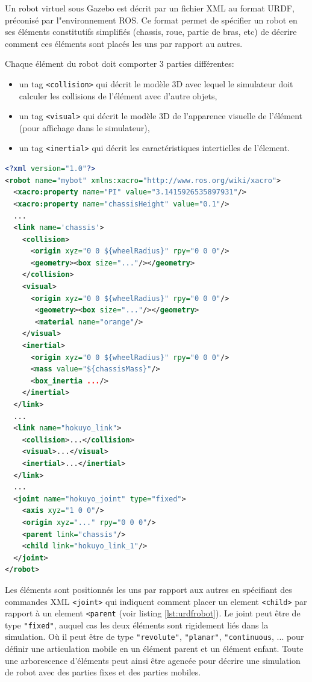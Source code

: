 \documentclass[12pt,a4paper]{report}
\begin{document}
		Un robot virtuel sous Gazebo est décrit par un fichier XML au format URDF, préconisé par l"environnement ROS. Ce format permet de spécifier un robot en ses éléments constitutifs simplifiés (chassis, roue, partie de bras, etc) de décrire comment ces éléments sont placés les uns par rapport au autres.
		
		\para Chaque élément  du robot doit comporter 3 parties différentes:
		\begin{itemize}
			\item un tag \verb|<collision>| qui décrit le modèle 3D avec lequel le simulateur doit calculer les collisions de l'élément avec d'autre objets,
			\item un tag \verb|<visual>| qui décrit le modèle 3D de l'apparence visuelle de l'élément (pour affichage dans le simulateur),
			\item un tag \verb|<inertial>| qui décrit les caractéristiques intertielles de l'élement.
		\end{itemize}
		\newpage
		
		\begin{lstlisting}[caption={Extrait d'une description URDF d'un robot},label={lst:urdfrobot},language=XML,captionpos=b,basicstyle=\footnotesize]
<?xml version="1.0"?>
<robot name="mybot" xmlns:xacro="http://www.ros.org/wiki/xacro">
  <xacro:property name="PI" value="3.1415926535897931"/>
  <xacro:property name="chassisHeight" value="0.1"/>
  ...			
  <link name='chassis'>
    <collision> 
      <origin xyz="0 0 ${wheelRadius}" rpy="0 0 0"/> 
      <geometry><box size="..."/></geometry> 
    </collision>
    <visual> 
      <origin xyz="0 0 ${wheelRadius}" rpy="0 0 0"/> 
       <geometry><box size="..."/></geometry> 
       <material name="orange"/>
    </visual>
    <inertial> 
      <origin xyz="0 0 ${wheelRadius}" rpy="0 0 0"/> 
      <mass value="${chassisMass}"/> 
      <box_inertia .../>
    </inertial>
  </link>
  ...
  <link name="hokuyo_link">
    <collision>...</collision>
    <visual>...</visual>
    <inertial>...</inertial>
  </link>
  ...	
  <joint name="hokuyo_joint" type="fixed">
    <axis xyz="1 0 0"/>
    <origin xyz="..." rpy="0 0 0"/>
    <parent link="chassis"/>
    <child link="hokuyo_link_1"/>
  </joint>		
</robot>
		\end{lstlisting}
	
		
		\para Les éléments sont positionnés les uns par rapport aux autres en spécifiant des commandes XML \verb|<joint>| qui indiquent comment placer un element \verb|<child>| par rapport à un element \verb|<parent| (voir listing \ref{lst:urdfrobot}). Le joint peut être de type \verb|"fixed"|, auquel cas les deux éléments sont rigidement liés dans la simulation. Où il peut être de type \verb|"revolute"|, \verb|"planar"|, \verb|"continuous|, ... pour définir une articulation mobile en un élément parent et un élément enfant.  Toute une arborescence d'éléments peut ainsi être agencée pour décrire une simulation de robot avec des parties fixes et des parties mobiles.
		
\end{document}
